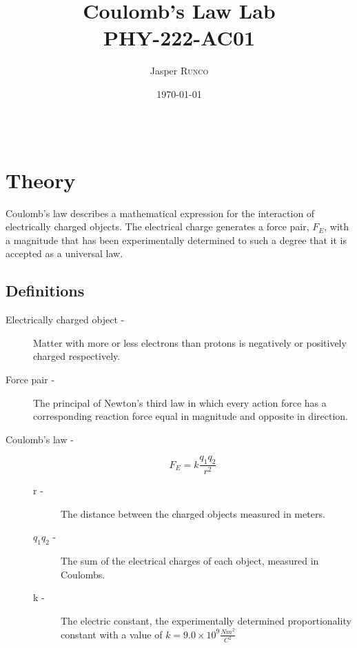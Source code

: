 \documentclass{article}
\title{Coulomb's Law Lab\\ PHY-222-AC01} %
\author{Jasper \textsc{Runco}} %
\date{\today} %
\begin{document}
\maketitle %

\begin{center}
	\begin{tabular}{l r}
	\end{tabular}
\end{center}



\section{Theory}

Coulomb's law describes a mathematical expression for the interaction of electrically charged objects.
The electrical charge generates a force pair, $F_{E}$, with a magnitude that has been experimentally determined
to such a degree that it is accepted as a universal law.

\subsection{Definitions}
\label{definitions}
\begin{description}
	\item[Electrically charged object -]
		Matter with more or less electrons than protons is negatively or
		positively charged respectively.
	\item[Force pair -]
		The principal of Newton's third law in which every action force has a corresponding reaction force
		equal in magnitude and opposite in direction.
	\item[Coulomb's law -]
		\[F_{E} = k \frac{q_1 q_2}{r^2}\]
		\begin{description}
			\item[r -]
				The distance between the charged objects measured in meters.
			\item[$q_1 q_2$ -]
				The sum of the electrical charges of each object, measured in Coulombs.
			\item[k -]
				The electric constant, the experimentally determined proportionality constant with a value
				of $k = 9.0 \times 10^{9} \frac{Nm^2}{C^2}$

		\end{description}
\end{description}
\end{document}
